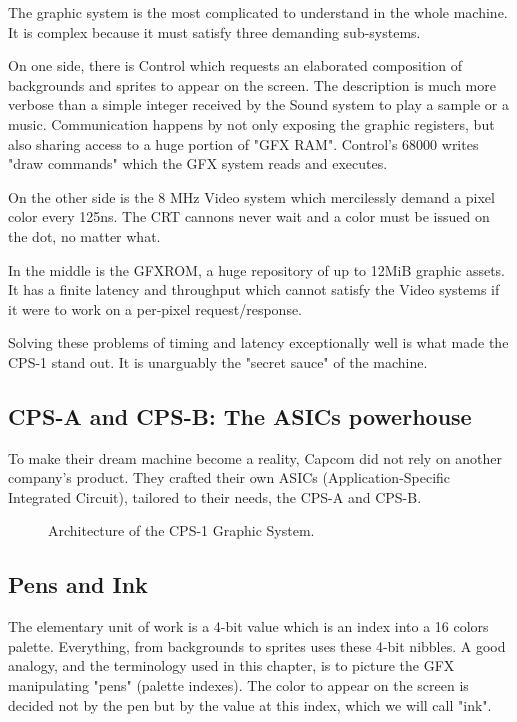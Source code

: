 The graphic system is the most complicated to understand in the whole machine. It is complex because it must satisfy three demanding sub-systems.

On one side, there is Control which requests an elaborated composition of backgrounds and sprites to appear on the screen. The description is much more verbose than a simple integer received by the Sound system to play a sample or a music. Communication happens by not only exposing the graphic registers, but also sharing access to a huge portion of "GFX RAM". Control's 68000 writes "draw commands" which the GFX system reads and executes.

On the other side is the 8 MHz Video system which mercilessly demand a pixel color every 125ns. The CRT cannons never wait and a color must be issued on the dot, no matter what. 

In the middle is the GFXROM, a huge repository of up to 12MiB graphic assets. It has a finite latency and throughput which cannot satisfy the Video systems if it were to work on a per-pixel request/response.

Solving these problems of timing and latency exceptionally well is what made the CPS-1 stand out. It is unarguably the "secret sauce" of the machine. 

\subsection{CPS-A and CPS-B: The ASICs powerhouse}
To make their dream machine become a reality, Capcom did not rely on another company's product. They crafted their own ASICs (Application-Specific Integrated Circuit), tailored to their needs, the CPS-A and CPS-B.


\begin{figure}[H]
\caption*{Architecture of the CPS-1 Graphic System.}
\end{figure}




\subsection{Pens and Ink}
The elementary unit of work is a 4-bit value which is an index into a 16 colors palette. Everything, from backgrounds to sprites uses these 4-bit nibbles. A good analogy, and the terminology used in this chapter, is to picture the GFX manipulating "pens" (palette indexes). The color to appear on the screen is decided not by the pen but by the value at this index, which we will call "ink".

